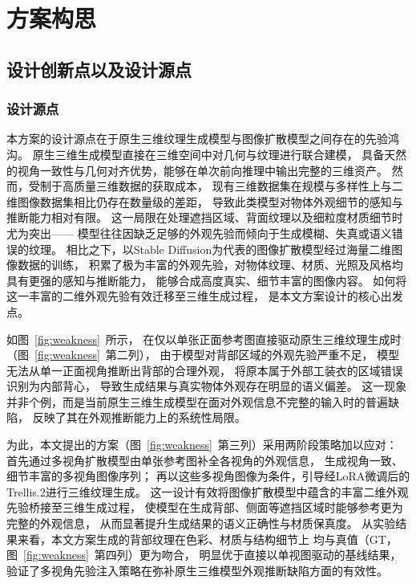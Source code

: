 \cleardoublepage

\section{方案构思}

\subsection{设计创新点以及设计源点}

\subsubsection{设计源点}

本方案的设计源点在于原生三维纹理生成模型与图像扩散模型之间存在的先验鸿沟。
原生三维生成模型直接在三维空间中对几何与纹理进行联合建模，
具备天然的视角一致性与几何对齐优势，能够在单次前向推理中输出完整的三维资产。
然而，受制于高质量三维数据的获取成本，
现有三维数据集在规模与多样性上与二维图像数据集相比仍存在数量级的差距，
导致此类模型对物体外观细节的感知与推断能力相对有限。
这一局限在处理遮挡区域、背面纹理以及细粒度材质细节时尤为突出——
模型往往因缺乏足够的外观先验而倾向于生成模糊、失真或语义错误的纹理。
相比之下，以Stable Diffusion为代表的图像扩散模型经过海量二维图像数据的训练，
积累了极为丰富的外观先验，对物体纹理、材质、光照及风格均具有更强的感知与推断能力，
能够合成高度真实、细节丰富的图像内容。
如何将这一丰富的二维外观先验有效迁移至三维生成过程，
是本文方案设计的核心出发点。

如图~\ref{fig:weakness}~所示，
在仅以单张正面参考图直接驱动原生三维纹理生成时（图~\ref{fig:weakness}~第二列），
由于模型对背部区域的外观先验严重不足，
模型无法从单一正面视角推断出背部的合理外观，
将原本属于外部工装衣的区域错误识别为内部背心，
导致生成结果与真实物体外观存在明显的语义偏差。
这一现象并非个例，而是当前原生三维生成模型在面对外观信息不完整的输入时的普遍缺陷，
反映了其在外观推断能力上的系统性局限。

为此，本文提出的方案（图~\ref{fig:weakness}~第三列）采用两阶段策略加以应对：
首先通过多视角扩散模型由单张参考图补全各视角的外观信息，
生成视角一致、细节丰富的多视角图像序列；
再以这些多视角图像为条件，引导经LoRA微调后的Trellis.2进行三维纹理生成。
这一设计有效将图像扩散模型中蕴含的丰富二维外观先验桥接至三维生成过程，
使模型在生成背部、侧面等遮挡区域时能够参考更为完整的外观信息，
从而显著提升生成结果的语义正确性与材质保真度。
从实验结果来看，本文方案生成的背部纹理在色彩、材质与结构细节上
均与真值（GT，图~\ref{fig:weakness}~第四列）更为吻合，
明显优于直接以单视图驱动的基线结果，
验证了多视角先验注入策略在弥补原生三维模型外观推断缺陷方面的有效性。


